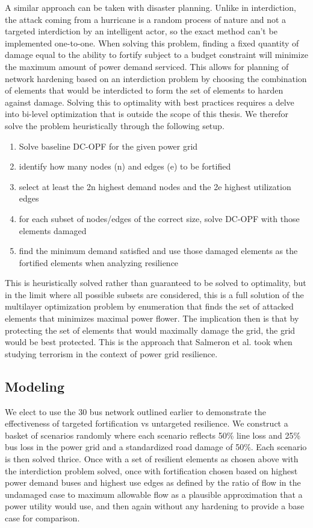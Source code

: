 \documentclass{article}
\begin{document}
	A similar approach can be taken with disaster planning. Unlike in interdiction, the attack coming from a hurricane is a random process of nature and not a targeted interdiction by an intelligent actor, so the exact method can't be implemented one-to-one. When solving this problem, finding a fixed quantity of damage equal to the ability to fortify subject to a budget constraint will minimize the maximum amount of power demand serviced. This allows for planning of network hardening based on an interdiction problem by choosing the combination of elements that would be interdicted to form the set of elements to harden against damage. Solving this to optimality with best practices requires a delve into bi-level optimization that is outside the scope of this thesis. We therefor solve the problem heuristically through the following setup.
	
	\begin{enumerate}
		
	\item Solve baseline DC-OPF for the given power grid
	\item identify how many nodes (n) and edges (e) to be fortified
	\item select at least the 2n highest demand nodes and the 2e highest utilization edges
	\item for each subset of nodes/edges of the correct size, solve DC-OPF with those elements damaged
	\item find the minimum demand satisfied and use those damaged elements as the fortified elements when analyzing resilience 
	\end{enumerate}

	This is heuristically solved rather than guaranteed to be solved to optimality, but in the limit where all possible subsets are considered, this is a full solution of the multilayer optimization problem by enumeration that finds the set of attacked elements that minimizes maximal power flower. The implication then is that by protecting the set of elements that would maximally damage the grid, the grid would be best protected. This is the approach that Salmeron et al. \cite{Salmeron2004} took when studying terrorism in the context of power grid resilience.
	\subsection{Modeling}
	We elect to use the 30 bus network outlined earlier to demonstrate the effectiveness of targeted fortification vs untargeted resilience. We construct a basket of scenarios randomly where each scenario reflects 50\% line loss and 25\% bus loss in the power grid and a standardized road damage of 50\%. Each scenario is then solved thrice. Once with a set of resilient elements as chosen above with the interdiction problem solved, once with fortification chosen based on highest power demand buses and highest use edges as defined by the ratio of flow in the undamaged case to maximum allowable flow as a plausible approximation that a power utility would use, and then again without any hardening to provide a base case for comparison.
	
\end{document}
